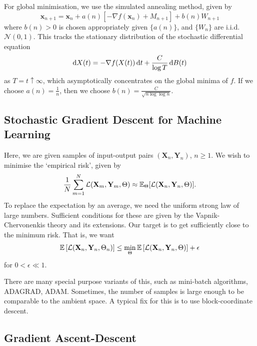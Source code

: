 For global minimisation, we use the simulated annealing method, given by
\[
    \mathbf{x}_{n+1} = \mathbf{x}_n + a(n) \left[ - \nabla f(\mathbf{x}_n) + M_{n+1} \right] + b(n) W_{n+1}
\]
where $b(n) > 0$ is chosen appropriately given $\{a(n)\}$, and $\{W_n\}$ are i.i.d. $\mathcal{N}(0,1)$. This tracks the stationary distribution of the stochastic differential equation
\[
    \mathrm{d} X(t) = - \nabla f(X(t)) \, \mathrm{d} t + \frac{C}{\log T} \, \mathrm{d} B(t)
\]
as $T = t \uparrow \infty$, which asymptotically concentrates on the global minima of $f$. If we choose $a(n) = \frac{1}{n}$, then we choose $b(n) = \frac{C}{\sqrt{n\log\log n}}$.

\subsection{Stochastic Gradient Descent for Machine Learning}

Here, we are given samples of input-output pairs $(\mathbf{X}_n, \mathbf{Y}_n)$, $n \geq 1$. We wish to minimise the `empirical risk', given by
\[
    \frac{1}{N} \sum_{m=1}^N \mathcal{L} (\mathbf{X}_m, \mathbf{Y}_m, \Theta) \approx \mathbb{E}_{\Theta}[\mathcal{L}(\mathbf{X}_n, \mathbf{Y}_n, \Theta)].
\]
To replace the expectation by an average, we need the uniform strong law of large numbers. Sufficient conditions for these are given by the Vapnik-Chervonenkis theory and its extensions. Our target is to get sufficiently close to the minimum risk. That is, we want
\[
    \mathbb{E} \left[ \mathcal{L}(\mathbf{X}_n, \mathbf{Y}_n, \Theta_n) \right] \leq \min_{\Theta} \mathbb{E}\left[ \mathcal{L}(\mathbf{X}_n, \mathbf{Y}_n, \Theta) \right] + \epsilon
\]
for $0 < \epsilon \ll 1$. 

There are many special purpose variants of this, such as mini-batch algorithms, ADAGRAD, ADAM. Sometimes, the number of samples is large enough to be comparable to the ambient space. A typical fix for this is to use block-coordinate descent. 

\subsection{Gradient Ascent-Descent}


